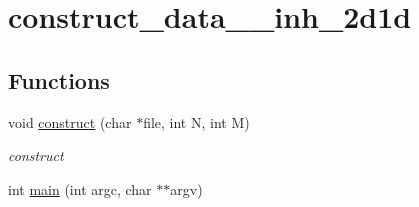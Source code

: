 \hypertarget{group__applications__mri2d__construct__data__inh__2d1d}{
\section{construct\_\-data\_\-\_\-inh\_\-2d1d}
\label{group__applications__mri2d__construct__data__inh__2d1d}
}
\subsection*{Functions}
\begin{CompactItemize}
\item 
\hypertarget{group__applications__mri2d__construct__data__inh__2d1d_g838247ac80ab4e2ac246eb969422bda1}{
void \hyperlink{group__applications__mri2d__construct__data__inh__2d1d_g838247ac80ab4e2ac246eb969422bda1}{construct} (char $\ast$file, int N, int M)}
\label{group__applications__mri2d__construct__data__inh__2d1d_g838247ac80ab4e2ac246eb969422bda1}

\begin{CompactList}\small\item\em construct \item\end{CompactList}\item 
\hypertarget{group__applications__mri2d__construct__data__inh__2d1d_g3c04138a5bfe5d72780bb7e82a18e627}{
int \hyperlink{group__applications__mri2d__construct__data__inh__2d1d_g3c04138a5bfe5d72780bb7e82a18e627}{main} (int argc, char $\ast$$\ast$argv)}
\label{group__applications__mri2d__construct__data__inh__2d1d_g3c04138a5bfe5d72780bb7e82a18e627}

\end{CompactItemize}
